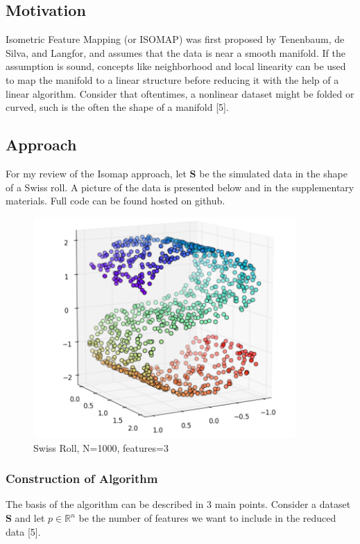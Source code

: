 \documentclass[12pt]{article}
\begin{document}
\subsection{Motivation}

\hspace{5mm}Isometric Feature Mapping (or ISOMAP) was first proposed by Tenenbaum, de Silva, and Langfor, and assumes that the data is near a smooth manifold. If the assumption is sound, concepts like neighborhood and local linearity can be used to map the manifold to a linear structure before reducing it with the help of a linear algorithm. Consider that oftentimes, a nonlinear dataset might be folded or curved, such is the often the shape of a manifold [5]. 


\subsection{Approach}
\hspace{5mm}For my review of the Isomap approach, let $\textbf{S}$ be the simulated data in the shape of a Swiss roll. A picture of the data is presented below and in the supplementary materials. Full code can be found hosted on github.

\begin{figure}[h!]
\centering    
\includegraphics[width=100mm]{swissroll1.png}
\caption{Swiss Roll, N=1000, features=3}
\label{fig: Swiss Roll}
\end{figure}

\subsubsection{Construction of Algorithm}

\hspace{5mm}The basis of the algorithm can be described in 3 main points. Consider a dataset $\textbf{S}$ and let $p\in\mathbb{R}^n$ be the number of features we want to include in the reduced data [5].
\end{document}

